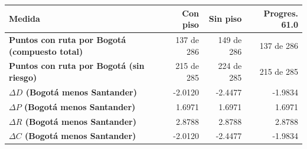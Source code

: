 \renewcommand{\arraystretch}{1.2}
\begin{tabular}{|l|r|r|r|}
\hline
\rowcolor{gray!20} \textbf{Medida} & \textbf{Con piso} & \textbf{Sin piso} & \textbf{Progres. 61.0} \\
\hline
\textbf{Puntos con ruta por Bogotá (compuesto total)} & 137 de 286 & 149 de 286 & 137 de 286 \\
\hline
\textbf{Puntos con ruta por Bogotá (sin riesgo)} & 215 de 285 & 224 de 285 & 215 de 285 \\
\hline
\textbf{$\Delta D$ (Bogotá menos Santander)} & -2.0120 & -2.4477 & -1.9834 \\
\hline
\textbf{$\Delta P$ (Bogotá menos Santander)} & 1.6971 & 1.6971 & 1.6971 \\
\hline
\textbf{$\Delta R$ (Bogotá menos Santander)} & 2.8788 & 2.8788 & 2.8788 \\
\hline
\textbf{$\Delta C$ (Bogotá menos Santander)} & -2.0120 & -2.4477 & -1.9834 \\
\hline
\end{tabular}
